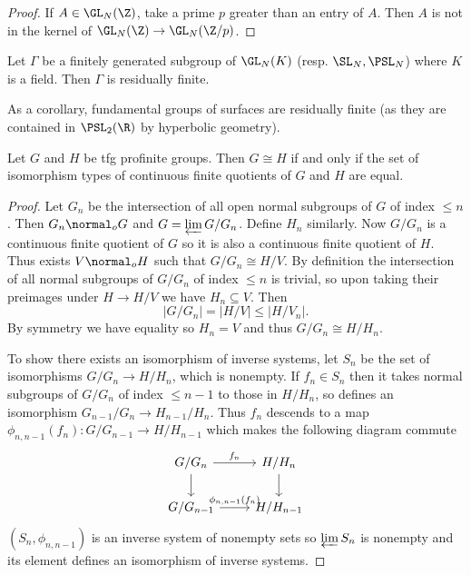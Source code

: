 \documentclass[a4paper]{article}
\begin{document}
\begin{proof}
  If \(A \in \GL_N(\Z)\), take a prime \(p\) greater than an entry of \(A\). Then \(A\) is not in the kernel of \(\GL_N(\Z) \to \GL_N(\Z/p)\).
\end{proof}

\begin{proposition}
  Let \(\Gamma\) be a finitely generated subgroup of \(\GL_N(K)\) (resp. \(\SL_N, \PSL_N\)) where \(K\) is a field. Then \(\Gamma\) is residually finite.
\end{proposition}

As a corollary, fundamental groups of surfaces are residually finite (as they are contained in \(\PSL_2(\R)\) by hyperbolic geometry).

\begin{theorem}
  Let \(G\) and \(H\) be tfg profinite groups. Then \(G \cong H\) if and only if the set of isomorphism types of continuous finite quotients of \(G\) and \(H\) are equal.
\end{theorem}

\begin{proof}
  Let \(G_n\) be the intersection of all open normal subgroups of \(G\) of index \(\leq n\). Then \(G_n \normal_o G\) and \(G = \varprojlim G/G_n\). Define \(H_n\) similarly. Now \(G/G_n\) is a continuous finite quotient of \(G\) so it is also a continuous finite quotient of \(H\). Thus exists \(V \normal_o H\) such that \(G/G_n \cong H/V\). By definition the intersection of all normal subgroups of \(G/G_n\) of index \(\leq n\) is trivial, so upon taking their preimages under \(H \to H/V\) we have \(H_n \subseteq V\). Then
  \[
    |G/G_n| = |H/V| \leq |H/V_n|.
  \]
  By symmetry we have equality so \(H_n = V\) and thus \(G/G_n \cong H/H_n\).

  To show there exists an isomorphism of inverse systems, let \(S_n\) be the set of isomorphisms \(G/G_n \to H/H_n\), which is nonempty. If \(f_n \in S_n\) then it takes normal subgroups of \(G/G_n\) of index \(\leq n - 1\) to those in \(H/H_n\), so defines an isomorphism \(G_{n - 1}/G_n \to H_{n - 1}/H_n\). Thus \(f_n\) descends to a map \(\phi_{n, n - 1}(f_n): G/G_{n - 1} \to H/H_{n - 1}\) which makes the following diagram commute
  \[
    \begin{tikzcd}
      G/G_n \ar[r, "f_n"] \ar[d] & H/H_n \ar[d] \\
      G/G_{n - 1} \ar[r, "\phi_{n, n - 1}(f_n)"] & H/H_{n - 1}
    \end{tikzcd}
  \]
  \((S_n, \phi_{n, n - 1})\) is an inverse system of nonempty sets so \(\varprojlim S_n\) is nonempty and its element defines an isomorphism of inverse systems.
\end{proof}
\end{document}
